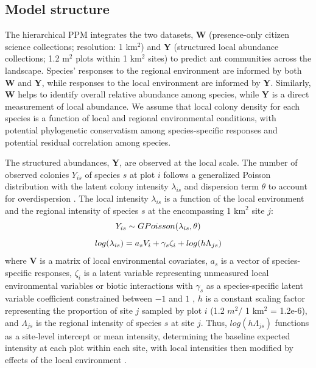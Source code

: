 \documentclass[preprint,review,times,12pt]{elsarticle}
\begin{document}
\subsection{Model structure}
The hierarchical PPM integrates the two datasets, \textbf{W} (presence-only citizen science collections; resolution: 1 km$^2$) and \textbf{Y} (structured local abundance collections; 1.2 m$^2$ plots within 1 km$^2$ sites) to predict ant communities across the landscape. Species' responses to the regional environment are informed by both \textbf{W} and \textbf{Y}, while responses to the local environment are informed by \textbf{Y}. Similarly, \textbf{W} helps to identify overall relative abundance among species, while \textbf{Y} is a direct measurement of local abundance. We assume that local colony density for each species is a function of local and regional environmental conditions, with potential phylogenetic conservatism among species-specific responses and potential residual correlation among species.

The structured abundances, \textbf{Y}, are observed at the local scale. The number of observed colonies $Y_{is}$ of species $s$ at plot $i$ follows a generalized Poisson distribution with the latent colony intensity $\lambda_{is}$ and dispersion term $\theta$ to account for overdispersion \citep{Consul1992,Ntzoufras2005,Isaac2019,Miller2019}. The local intensity $\lambda_{is}$ is a function of the local environment and the regional intensity of species $s$ at the encompassing 1 km$^2$ site $j$:
    \begin{equation}
        Y_{is} \sim GPoisson(\lambda_{is}, \theta) \\
        \label{eq:Y_GP}
    \end{equation}
    \begin{equation}
        log(\lambda_{is}) = a_s V_i + \gamma_s \zeta_i + log(h\Lambda_{js}) \\
        \label{eq:lambda}
    \end{equation}
where \textbf{V} is a matrix of local environmental covariates, $a_s$ is a vector of species-specific responses, $\zeta_i$ is a latent variable representing unmeasured local environmental variables or biotic interactions with $\gamma_s$ as a species-specific latent variable coefficient constrained between $-1$ and $1$ \citep{Ovaskainen2016,Caradima2019,Tobler2019}, $h$ is a constant scaling factor representing the proportion of site $j$ sampled by plot $i$ (1.2 $m^2 /$ 1 km$^2$ = 1.2e-6), and $\Lambda_{js}$ is the regional intensity of species $s$ at site $j$. Thus, $log(h\Lambda_{js})$ functions as a site-level intercept or mean intensity, determining the baseline expected intensity at each plot within each site, with local intensities then modified by effects of the local environment \citep{Yamaura2016,Miller2019}.
\end{document}
